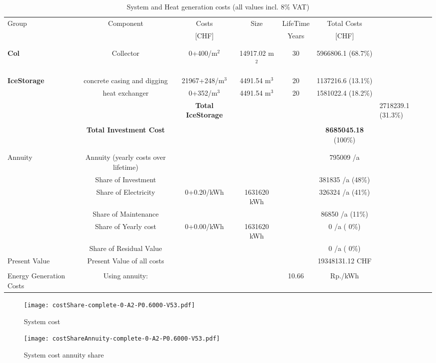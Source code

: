 \documentclass[english]{SPFShortReport}
\begin{document}
\begin{table}[!ht]
\centering
\caption{System and Heat generation costs (all values incl. 8$\%$ VAT) }
\begin{adjustbox}{max width =\textwidth}
\begin{tabular}{l | c c c c c } 
\hline
\hline
Group &Component &Costs &Size &LifeTime &Total Costs \\ 
 & &[CHF] & &Years &[CHF]\\ 
\hline
\\
\hline \\
\textbf{Col} & Collector & 0+400/m$^2$ & 14917.02 m$^2$ & 30 & 5966806.1 (68.7\%) \\
\hline \\
\hline \\
\textbf{IceStorage} & concrete casing and digging & 21967+248/m$^3$ & 4491.54 m$^3$ & 20 & 1137216.6 (13.1\%) \\
 & heat exchanger & 0+352/m$^3$ & 4491.54 m$^3$ & 20 & 1581022.4 (18.2\%) \\
&
 & \textbf{Total IceStorage} & & & & 2718239.1 (31.3\%) \\
\hline \\
 & \textbf{Total Investment Cost} & & & & \textbf{8685045.18} (100\%) \\ 
\hline \\ 
\hline \\ 
Annuity & Annuity (yearly costs over lifetime)  &&& & 795009 /a  \\
 & Share of Investment & &&& 381835 /a (48\%) \\
 & Share of Electricity & 0+0.20/kWh & 1631620 kWh &  & 326324 /a (41\%)\\
 & Share of Maintenance & &&& 86850 /a (11\%)\\ 
 & Share of Yearly cost & 0+0.00/kWh & 1631620 kWh & &  0 /a ( 0\%)\\
 & Share of Residual Value &&& &  0 /a ( 0\%)\\
Present Value  & Present Value of all costs  & &&& 19348131.12 CHF \\
\hline \\ 
 Energy Generation Costs & Using annuity: &&& 10.66 & Rp./kWh \\
\hline
\hline
\end{tabular}
\end{adjustbox}
\label{CostsTable}
\end{table}
\begin{figure}[!htbp]
\begin{center}
\texttt{[image: costShare-complete-0-A2-P0.6000-V53.pdf]}
\caption{System cost}
\label{systemCost}
\end{center}
\end{figure}
\begin{figure}[!htbp]
\begin{center}
\texttt{[image: costShareAnnuity-complete-0-A2-P0.6000-V53.pdf]}
\caption{System cost annuity share}
\label{systemCostannuity}
\end{center}
\end{figure}
\end{document}
